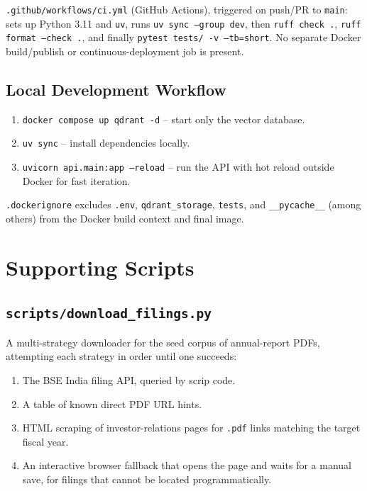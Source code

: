 \documentclass[11pt,a4paper]{report}
\newcommand{\code}[1]{\texttt{#1}}
\newcommand{\file}[1]{\texttt{\small #1}}
\begin{document}
\file{.github/workflows/ci.yml} (GitHub Actions), triggered on push/PR to
\code{main}: sets up Python 3.11 and \code{uv}, runs \code{uv sync --group dev}, then
\code{ruff check .}, \code{ruff format --check .}, and finally \code{pytest tests/ -v
--tb=short}. No separate Docker build/publish or continuous-deployment job is present.

\section{Local Development Workflow}

\begin{enumerate}
    \item \code{docker compose up qdrant -d} -- start only the vector database.
    \item \code{uv sync} -- install dependencies locally.
    \item \code{uvicorn api.main:app --reload} -- run the API with hot reload outside
    Docker for fast iteration.
\end{enumerate}

\file{.dockerignore} excludes \file{.env}, \file{qdrant\_storage}, \file{tests}, and
\file{\_\_pycache\_\_} (among others) from the Docker build context and final image.

\chapter{Supporting Scripts}

\section{\file{scripts/download\_filings.py}}

A multi-strategy downloader for the seed corpus of annual-report PDFs, attempting each
strategy in order until one succeeds:

\begin{enumerate}
    \item The BSE India filing API, queried by scrip code.
    \item A table of known direct PDF URL hints.
    \item HTML scraping of investor-relations pages for \code{.pdf} links matching the
    target fiscal year.
    \item An interactive browser fallback that opens the page and waits for a manual
    save, for filings that cannot be located programmatically.
\end{enumerate}
\end{document}
